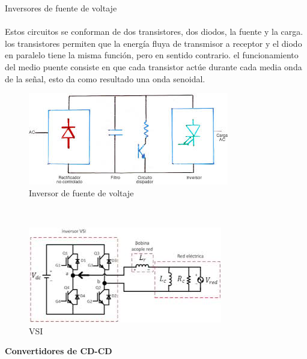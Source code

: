\documentclass[12pt]{report}
\begin{document}
 {\Large Inversores de fuente de voltaje}\\\\
  Estos circuitos se conforman de dos transistores, dos diodos, la fuente y la carga. los transistores permiten que la energía fluya de transmisor a receptor y el diodo en paralelo tiene la misma función, pero en sentido contrario. el funcionamiento del medio puente consiste en que cada transistor actúe durante cada media onda de la señal, esto da como resultado una onda senoidal.\\
  \begin{figure}[hbtp]
  \caption{Inversor de fuente de voltaje}
  \centering
  \includegraphics[scale=1]{vsi.jpg}
  \end{figure}
  \\\begin{figure}[hbtp]
  \caption{VSI}
  \centering
  \includegraphics[scale=1]{descarga.jpg}
  \end{figure}
  
{\huge\textbf{Convertidores de CD-CD}\\}\\
 
\end{document}

